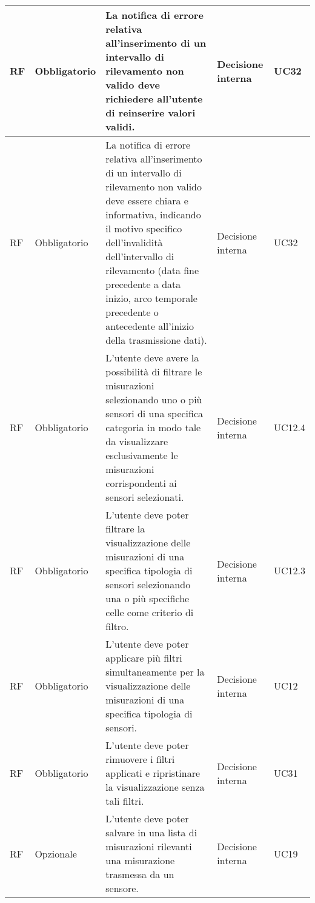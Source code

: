 \begin{longtable}{|C{1.5cm}|C{2cm}|L{5cm}|C{2cm}|C{1.5cm}|}
    \hline
     RF & Obbligatorio & La notifica di errore relativa all'inserimento di un intervallo di rilevamento non valido deve richiedere all'utente di reinserire valori validi. & Decisione interna & UC32 \\
    
    \hline
     RF & Obbligatorio & La notifica di errore relativa all'inserimento di un intervallo di rilevamento non valido deve essere chiara e informativa, indicando il motivo specifico dell'invalidità dell'intervallo di rilevamento (data fine precedente a data inizio, arco temporale precedente o antecedente all'inizio della trasmissione dati). & Decisione interna & UC32 \\
    
    \hline
     RF & Obbligatorio & L'utente deve avere la possibilità di filtrare le misurazioni selezionando uno o più sensori di una specifica categoria in modo tale da visualizzare esclusivamente le misurazioni corrispondenti ai sensori selezionati. & Decisione interna & UC12.4 \\
    
    \hline
     RF & Obbligatorio & L'utente deve poter filtrare la visualizzazione delle misurazioni di una specifica tipologia di sensori selezionando una o più specifiche celle come criterio di filtro. & Decisione interna & UC12.3 \\
    
    \hline
     RF & Obbligatorio & L'utente deve poter applicare più filtri simultaneamente per la visualizzazione delle misurazioni di una specifica tipologia di sensori. & Decisione interna & UC12 \\
    
    \hline
     RF & Obbligatorio & L'utente deve poter rimuovere i filtri applicati e ripristinare la visualizzazione senza tali filtri. & Decisione interna & UC31 \\
    
    \hline
     RF & Opzionale & L'utente deve poter salvare in una lista di misurazioni rilevanti una misurazione trasmessa da un sensore. & Decisione interna & UC19 \\
    

\end{longtable}
